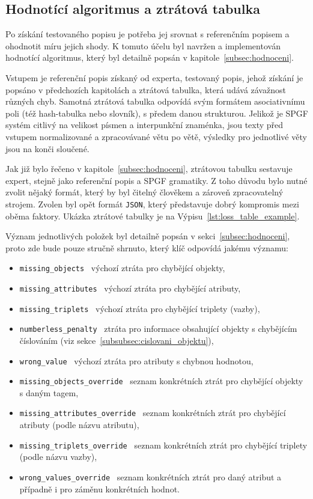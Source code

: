 \subsection{Hodnotící algoritmus a ztrátová tabulka}
Po získání testovaného popisu je potřeba jej srovnat s referenčním popisem a ohodnotit míru jejich shody.
K tomuto účelu byl navržen a implementován hodnotící algoritmus, který byl detailně popsán v kapitole~\ref{subsec:hodnoceni}.

Vstupem je referenční popis získaný od experta, testovaný popis, jehož získání je popsáno v předchozích kapitolách a ztrátová tabulka,
která udává závažnost různých chyb.
Samotná ztrátová tabulka odpovídá svým formátem asociativnímu poli (též hash-tabulka nebo slovník), s předem danou strukturou.
Jelikož je SPGF systém citlivý na velikost písmen a interpunkční znaménka, jsou texty před vstupem normalizované
a zpracovávané větu po větě, výsledky pro jednotlivé věty jsou na konči sloučené.

Jak již bylo řečeno v kapitole~\ref{subsec:hodnoceni}, ztrátovou tabulku sestavuje expert, stejně jako referenční popis a SPGF gramatiky.
Z toho důvodu bylo nutné zvolit nějaký formát, který by byl čitelný člověkem a zároveň zpracovatelný strojem.
Zvolen byl opět formát \texttt{JSON}, který představuje dobrý kompromis mezi oběma faktory.
Ukázka ztrátové tabulky je na Výpisu~\ref{lst:loss_table_example}.



Význam jednotlivých položek byl detailně popsán v sekci~\ref{subsec:hodnoceni}, proto zde bude pouze stručně shrnuto,
který klíč odpovídá jakému významu:
\begin{itemize}
	\item \texttt{missing\_objects} \to\ výchozí ztráta pro chybějící objekty,
	\item \texttt{missing\_attributes} \to\ výchozí ztráta pro chybějící atributy,
	\item \texttt{missing\_triplets} \to\ výchozí ztráta pro chybějící triplety (vazby),
	\item \texttt{numberless\_penalty} \to\ ztráta pro informace obsahující objekty s chybějícím číslováním (viz sekce~\ref{subsubsec:cislovani_objektu}),
	\item \texttt{wrong\_value} \to\ výchozí ztráta pro atributy s chybnou hodnotou,
	\item \texttt{missing\_objects\_override} \to\ seznam konkrétních ztrát pro chybějící objekty s daným tagem,
	\item \texttt{missing\_attributes\_override} \to\ seznam konkrétních ztrát pro chybějící atributy (podle názvu atributu),
	\item \texttt{missing\_triplets\_override} \to\ seznam konkrétních ztrát pro chybějící triplety (podle názvu vazby),
	\item \texttt{wrong\_values\_override} \to\ seznam konkrétních ztrát pro daný atribut a případně i pro záměnu konkrétních hodnot.
\end{itemize}

